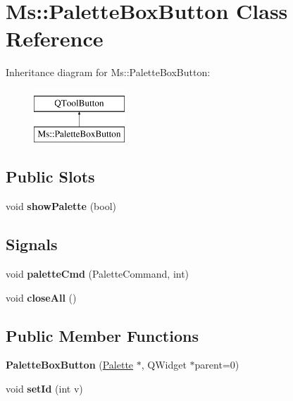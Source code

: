 \hypertarget{class_ms_1_1_palette_box_button}{}\section{Ms\+:\+:Palette\+Box\+Button Class Reference}
\label{class_ms_1_1_palette_box_button}
Inheritance diagram for Ms\+:\+:Palette\+Box\+Button\+:\begin{figure}[H]
\begin{center}
\leavevmode
\includegraphics[height=2.000000cm]{class_ms_1_1_palette_box_button}
\end{center}
\end{figure}
\subsection*{Public Slots}
\begin{DoxyCompactItemize}
\item 
\mbox{\label{class_ms_1_1_palette_box_button_af1d98fb0bfe4a9f3bfd5e128969a9d65}} 
void {\bfseries show\+Palette} (bool)
\end{DoxyCompactItemize}
\subsection*{Signals}
\begin{DoxyCompactItemize}
\item 
\mbox{\label{class_ms_1_1_palette_box_button_aa0161673152eb3bb4c5db2be303a5930}} 
void {\bfseries palette\+Cmd} (Palette\+Command, int)
\item 
\mbox{\label{class_ms_1_1_palette_box_button_a5636a7230cc0de48bf632565be7f3b6b}} 
void {\bfseries close\+All} ()
\end{DoxyCompactItemize}
\subsection*{Public Member Functions}
\begin{DoxyCompactItemize}
\item 
\mbox{\label{class_ms_1_1_palette_box_button_a34e3d01e1f7e3b3a9189e9188db45aca}} 
{\bfseries Palette\+Box\+Button} (\hyperlink{class_ms_1_1_palette}{Palette} $\ast$, Q\+Widget $\ast$parent=0)
\item 
\mbox{\label{class_ms_1_1_palette_box_button_ad9913e27ec498623fe255bcc05baa76d}} 
void {\bfseries set\+Id} (int v)
\end{DoxyCompactItemize}


